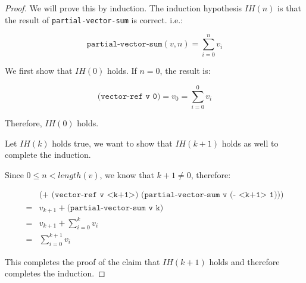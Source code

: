\documentclass[11pt,a4paper]{article}
\begin{document}
\begin{proof}
We will prove this by induction.
The induction hypothesis $IH(n)$ is that
the result of \texttt{partial-vector-sum} is correct. i.e.:

\[
    \texttt{partial-vector-sum}(v,n) = \sum_{i=0}^{n}v_i
\]

We first show that $IH(0)$ holds. If $n=0$, the result is:

\[
    \texttt{(vector-ref v 0)} = v_0 = \sum_{i=0}^{0}v_i
\]

Therefore, $IH(0)$ holds.

Let $IH(k)$ holds true, we want to show that $IH(k+1)$ holds as well
to complete the induction.

Since $0 \le n < length(v)$, we know that $k + 1 \neq 0$, therefore:

\begin{align*}
    & \texttt{(+ (vector-ref v <k+1>) (partial-vector-sum v (- <k+1> 1)))} \\
    = & v_{k+1} + \texttt{(partial-vector-sum v k)} \\
    = & v_{k+1} + \sum_{i=0}^{k}v_i \\
    = & \sum_{i=0}^{k+1}v_i
\end{align*}

This completes the proof of the claim that $IH(k+1)$ holds and therefore
completes the induction.

\end{proof}
\end{document}
